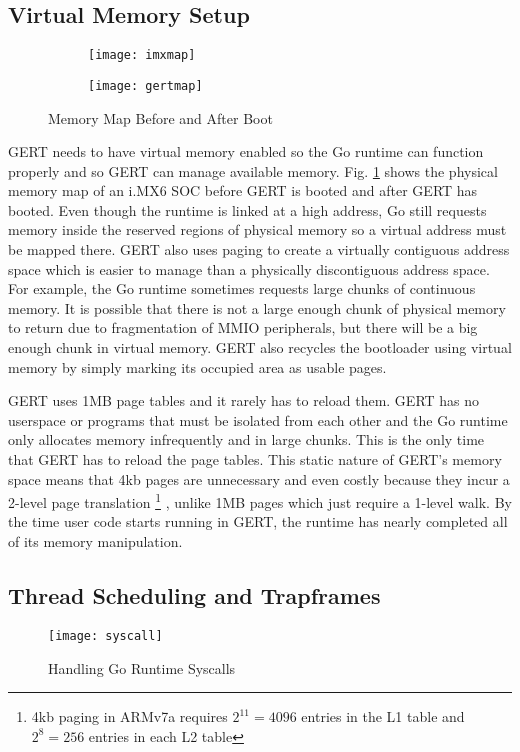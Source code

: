 \subsection{Virtual Memory Setup}
\begin{figure}[h]
  \begin{subfigure}[t!]{0.5\textwidth}
 \texttt{[image: imxmap]}
  \end{subfigure}
  \begin{subfigure}[t!]{0.5\textwidth}
 \texttt{[image: gertmap]}
  \end{subfigure}
  \caption{Memory Map Before and After Boot} \label{fig:gertmap}
\end{figure}

GERT needs to have virtual memory enabled so the Go runtime can function properly and so
GERT can manage available memory. Fig. \ref{fig:gertmap} shows the physical memory map
of an i.MX6 SOC before GERT is booted and after GERT has booted.
Even though the
runtime is linked at a high address, Go still requests memory inside the reserved regions of physical
memory so a virtual address must be mapped there. GERT also uses paging to create a virtually contiguous
address space which is easier to manage than a physically discontiguous address space. For example,
the Go runtime sometimes requests large chunks of continuous memory. It is possible that there is not
a large enough chunk of physical memory to return due to fragmentation of MMIO peripherals, but there
will be a big enough chunk in virtual memory. GERT also recycles the bootloader using virtual
memory by simply marking its occupied area as usable pages.

GERT uses 1MB page tables and it rarely has to reload them. GERT has no userspace or programs
that must be isolated from each other and the Go runtime only allocates memory infrequently
and in large chunks. This is the only time that GERT has to reload the page tables.
This static nature of GERT's memory space means that 4kb pages are unnecessary
and even costly because they incur a 2-level page translation \footnote{4kb paging in ARMv7a requires $2^11=4096$ entries in the L1 table and $2^8=256$ entries in each L2 table} , unlike 1MB pages which just require
a 1-level walk. By the time user code starts running in GERT, the runtime has nearly completed
all of its memory manipulation.

\subsection{Thread Scheduling and Trapframes}
\begin{figure}[h]
\begin{center}
  \texttt{[image: syscall]}
\end{center}
  \caption{Handling Go Runtime Syscalls} \label{fig:syscall}
\end{figure}

